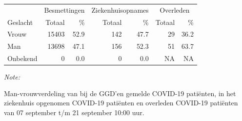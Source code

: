 \documentclass[
  english,
  man,floatsintext]{apa6}
\begin{document}
\begin{table}
\centering\begingroup\fontsize{11}{13}\selectfont

\begin{threeparttable}
\begin{tabular}{lrrrrrr}
\toprule
\multicolumn{1}{c}{ } & \multicolumn{2}{c}{Besmettingen} & \multicolumn{2}{c}{Ziekenhuisopnames} & \multicolumn{2}{c}{Overleden} \\
\cmidrule(l{3pt}r{3pt}){2-3} \cmidrule(l{3pt}r{3pt}){4-5} \cmidrule(l{3pt}r{3pt}){6-7}
Geslacht & Totaal & \% & Totaal & \% & Totaal & \%\\
\midrule
Vrouw & 15403 & 52.9 & 142 & 47.7 & 29 & 36.2\\
Man & 13698 & 47.1 & 156 & 52.3 & 51 & 63.7\\
Onbekend & 0 & 0.0 & 0 & 0.0 & NA & NA\\
\bottomrule
\end{tabular}
\begin{tablenotes}
\item \textit{Note: } 
\item Man-vrouwverdeling van bij de GGD’en gemelde COVID-19 patiënten, in het ziekenhuis opgenomen COVID-19 patiënten en overleden COVID-19 patiënten van 07 september t/m 21 september 10:00 uur.
\end{tablenotes}
\end{threeparttable}
\endgroup{}
\end{table}
\newpage
\end{document}
